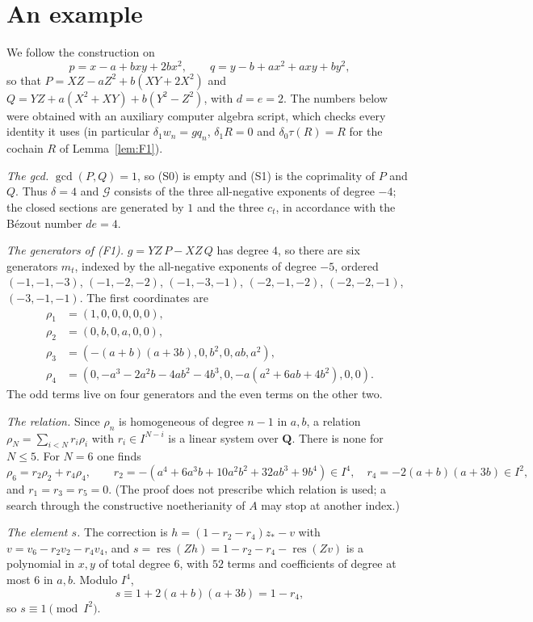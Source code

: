 \documentclass[11pt]{amsart}
\theoremstyle{definition}
\theoremstyle{remark}
\DeclareMathOperator{\res}{res}
\newcommand{\gcdop}{\operatorname{gcd}}
\begin{document}
\section{An example}\label{sec:example}

We follow the construction on
\[
 p=x-a+bxy+2bx^2,\qquad q=y-b+ax^2+axy+by^2,
\]
so that $P=XZ-aZ^2+b(XY+2X^2)$ and $Q=YZ+a(X^2+XY)+b(Y^2-Z^2)$, with
$d=e=2$. The numbers below were obtained with an auxiliary computer algebra
script, which checks every identity it uses (in particular
$\delta_1w_n=gq_n$, $\delta_1R=0$ and $\delta_0\tau(R)=R$ for the cochain
$R$ of Lemma~\ref{lem:F1}).

\emph{The gcd.} $\gcdop(P,Q)=1$, so (S0) is empty and (S1) is the
coprimality of $P$ and $Q$. Thus $\delta=4$ and $\mathcal G$ consists of
the three all-negative exponents of degree $-4$; the closed sections are
generated by $1$ and the three $c_t$, in accordance with the Bézout number
$de=4$.

\emph{The generators of (F1).} $g=YZ\,P-XZ\,Q$ has degree $4$, so there are
six generators $m_t$, indexed by the all-negative exponents of degree $-5$,
ordered $(-1,-1,-3)$, $(-1,-2,-2)$, $(-1,-3,-1)$, $(-2,-1,-2)$,
$(-2,-2,-1)$, $(-3,-1,-1)$. The first coordinates are
\begin{align*}
 \rho_1&=(1,0,0,0,0,0),\\
 \rho_2&=(0,b,0,a,0,0),\\
 \rho_3&=(-(a+b)(a+3b),0,b^2,0,ab,a^2),\\
 \rho_4&=(0,-a^3-2a^2b-4ab^2-4b^3,0,-a(a^2+6ab+4b^2),0,0).
\end{align*}
The odd terms live on four generators and the even terms on the other two.

\emph{The relation.} Since $\rho_n$ is homogeneous of degree $n-1$ in
$a,b$, a relation $\rho_N=\sum_{i<N}r_i\rho_i$ with $r_i\in I^{N-i}$ is a
linear system over $\mathbf Q$. There is none for $N\le5$. For $N=6$ one
finds
\[
 \rho_6=r_2\rho_2+r_4\rho_4,\qquad
 r_2=-(a^4+6a^3b+10a^2b^2+32ab^3+9b^4)\in I^4,\quad
 r_4=-2(a+b)(a+3b)\in I^2 ,
\]
and $r_1=r_3=r_5=0$. (The proof does not prescribe which relation is used;
a search through the constructive noetherianity of $A$ may stop at another
index.)

\emph{The element $s$.} The correction is
$h=(1-r_2-r_4)z_*-v$ with $v=v_6-r_2v_2-r_4v_4$, and
$s=\res(Zh)=1-r_2-r_4-\res(Zv)$ is a polynomial in $x,y$ of total degree
$6$, with $52$ terms and coefficients of degree at most $6$ in $a,b$.
Modulo $I^4$,
\[
 s\equiv1+2(a+b)(a+3b)=1-r_4 ,
\]
so $s\equiv1\pmod{I^2}$.
\end{document}
